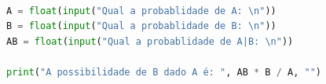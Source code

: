 \begin{lstlisting}[language=Python]

A = float(input("Qual a probablidade de A: \n"))
B = float(input("Qual a probablidade de B: \n"))
AB = float(input("Qual a probablidade de A|B: \n"))

print("A possibilidade de B dado A é: ", AB * B / A, "")

\end{lstlisting}
